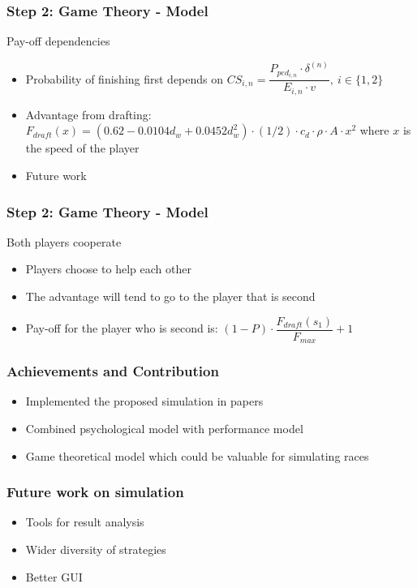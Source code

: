 \documentclass{beamer}
\begin{document}
\begin{frame}
\frametitle{Step 2: Game Theory - Model}
\begin{block}{Pay-off dependencies}
	\begin{itemize}
		\item Probability of finishing first depends on $CS_{i,n} = \dfrac{P_{ped_{i,n}} \cdot \delta^{(n)}}{E_{i,n} \cdot v},\ i\in\{1,2\}$
		\item Advantage from drafting: $F_{draft}(x) = (0.62 - 0.0104 d_w + 0.0452 d_w^2)\cdot (1/2)\cdot c_d\cdot \rho\cdot A\cdot x^2$ where $x$ is the speed of the player
		\item Future work
	\end{itemize}
\end{block}
\end{frame}

\begin{frame}
\frametitle{Step 2: Game Theory - Model}
\begin{block}{Both players cooperate}
	\begin{itemize}
		\item Players choose to help each other
		\item The advantage will tend to go to the player that is second
		\item Pay-off for the player who is second is: $(1-P)\cdot \dfrac{F_{draft}(s_1)}{F_{max}} + 1$
	\end{itemize}
\end{block}
\end{frame}

\begin{frame}
\frametitle{Achievements and Contribution}

\begin{itemize}
	\item Implemented the proposed simulation in papers %
	\item Combined psychological model with performance model
	\item Game theoretical model which could be valuable for simulating races
\end{itemize}

\end{frame}

\begin{frame}
\frametitle{Future work on simulation}
\begin{itemize}
	\item Tools for result analysis
	\item Wider diversity of strategies
	\item Better GUI
\end{itemize}
\end{frame}
\end{document}

